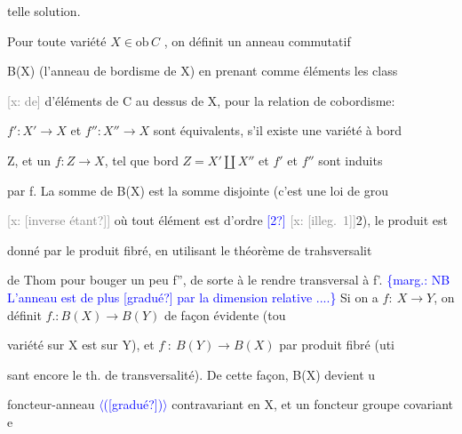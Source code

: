 \documentclass[11pt]{article}
\newcommand{\scanpage}[1]{\par\bigskip\noindent{\small\sffamily[scan #1]}\par}
\newcommand{\mspage}[1]{{\small\sffamily[p.\,#1]}}
\newcommand{\hand}[1]{\textcolor{blue}{#1}}
\newcommand{\inserted}[2][]{\textcolor{blue}{$\langle$#2$\rangle$}}
\newcommand{\margin}[1]{\textcolor{blue}{\{\textsf{marg.:} #1\}}}
\newcommand{\xout}[1]{\textcolor{gray}{[\textsf{x:} #1]}}
\newcommand{\unsure}[1]{[#1?]}
\newcommand{\illegible}[1]{[\textsf{illeg.\ #1}]}
\begin{document}
telle solution.

Pour toute variété $X\in \mathrm{ob}\, C$ , on définit un anneau commutatif

B(X) (l'anneau de bordisme de X) en prenant comme éléments les class

\xout{de} d'éléments de C au dessus de X, pour la relation de cobordisme:

$f'{:}X'\to X$ et $f''{:}X''\to X$ sont équivalents, s'il existe une variété à bord

Z, et un $f{:}Z\to X$, tel que bord $Z = X'\amalg X''$ et $f'$ et $f''$ sont induits

par f. La somme de B(X) est la somme disjointe (c'est une loi de grou

\xout{\unsure{inverse étant}} où tout élément est d'ordre \hand{\unsure{2}} \xout{\illegible{1}}2), le produit est

donné par le produit fibré, en utilisant le théorème de trahsversalit

de Thom pour bouger un peu f'', de sorte à le rendre transversal à f'.
\margin{NB L'anneau est de plus \unsure{gradué} par la dimension relative ....}
Si on a $f{:}\ X\to Y$, on définit $f. : B(X)\to B(Y)$ de façon évidente (tou

variété sur X est sur Y), et $f^{\cdot}{:}\ B(Y)\to B(X)$ par produit fibré (uti

sant encore le th. de transversalité). De cette façon, B(X) devient u

foncteur-anneau \inserted{(\unsure{gradué})} contravariant en X, et un foncteur groupe covariant e

\mspage{12}

\clearpage
\scanpage{162-5/13}
\mspage{12}
\end{document}
